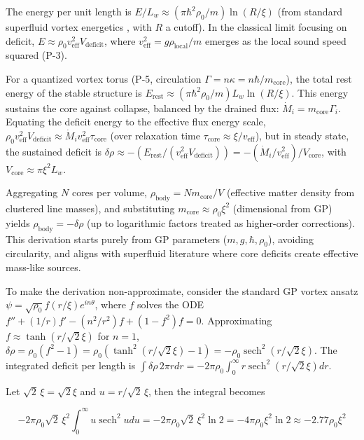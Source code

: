 \documentclass{article}
\DeclareMathOperator{\sech}{sech}
\newcommand{\scale}{\sqrt{2}\,\xi}
\begin{document}
The energy per unit length is $E / L_w \approx (\pi \hbar^2 \rho_0 / m) \ln(R / \xi)$ (from standard superfluid vortex energetics \cite{onsager1949, feynman1955}, with $R$ a cutoff). In the classical limit focusing on deficit, $E \approx \rho_0 v_{\text{eff}}^2 V_{\text{deficit}}$, where $v_{\text{eff}}^2 = g \rho_{\text{local}} / m$ emerges as the local sound speed squared (P-3).

For a quantized vortex torus (P-5, circulation $\Gamma = n \kappa = n \hbar / m_{\text{core}}$), the total rest energy of the stable structure is $E_{\text{rest}} \approx (\pi \hbar^2 \rho_0 / m) L_w \ln(R / \xi)$. This energy sustains the core against collapse, balanced by the drained flux: $\dot{M}_i = m_{\text{core}} \Gamma_i$. Equating the deficit energy to the effective flux energy scale, $\rho_0 v_{\text{eff}}^2 V_{\text{deficit}} \approx \dot{M}_i v_{\text{eff}}^2 \tau_{\text{core}}$ (over relaxation time $\tau_{\text{core}} \approx \xi / v_{\text{eff}}$), but in steady state, the sustained deficit is $\delta \rho \approx - (E_{\text{rest}} / (v_{\text{eff}}^2 V_{\text{deficit}})) = - (\dot{M}_i / v_{\text{eff}}^2) / V_{\text{core}}$, with $V_{\text{core}} \approx \pi \xi^2 L_w$.

Aggregating $N$ cores per volume, $\rho_{\text{body}} = N m_{\text{core}} / V$ (effective matter density from clustered line masses), and substituting $m_{\text{core}} \approx \rho_0 \xi^2$ (dimensional from GP) yields $\rho_{\text{body}} = - \delta \rho$ (up to logarithmic factors treated as higher-order corrections). This derivation starts purely from GP parameters ($m, g, \hbar, \rho_0$), avoiding circularity, and aligns with superfluid literature where core deficits create effective mass-like sources.

To make the derivation non-approximate, consider the standard GP vortex ansatz $\psi = \sqrt{\rho_0} f(r/\xi) e^{i n \theta}$, where $f$ solves the ODE $f'' + (1/r) f' - (n^2/r^2) f + (1 - f^2) f = 0$. Approximating $f \approx \tanh(r/\sqrt{2} \xi)$ for $n=1$, $\delta \rho = \rho_0 (f^2 - 1) = \rho_0 (\tanh^2(r/\sqrt{2} \xi) - 1) = - \rho_0 \sech^2(r/\sqrt{2} \xi)$. The integrated deficit per length is $\int \delta \rho \, 2\pi r dr = -2\pi \rho_0 \int_0^\infty r \sech^2(r/\sqrt{2} \xi) dr$.

Let $\scale = \sqrt{2} \xi$ and $u = r / \scale$, then the integral becomes

\[
-2\pi \rho_0 \scale^2 \int_0^\infty u \sech^2 u du = -2\pi \rho_0 \scale^2 \ln 2 = -4\pi \rho_0 \xi^2 \ln 2 \approx -2.77 \rho_0 \xi^2
\]
\end{document}
